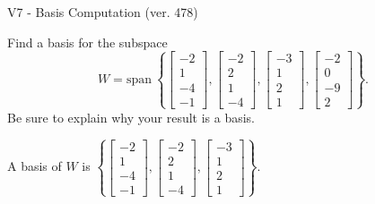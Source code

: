 \begin{exercise}
  \begin{exerciseTitle}V7 - Basis Computation (ver. 478)\end{exerciseTitle}
  \begin{exerciseStatement}
    Find a basis for the subspace 
\[W=\mathrm{span}\ \left\{\left[\begin{array}{r}
-2 \\
1 \\
-4 \\
-1
\end{array}\right] , \left[\begin{array}{r}
-2 \\
2 \\
1 \\
-4
\end{array}\right] , \left[\begin{array}{r}
-3 \\
1 \\
2 \\
1
\end{array}\right] , \left[\begin{array}{r}
-2 \\
0 \\
-9 \\
2
\end{array}\right]\right\}.\]
 Be sure to explain why your result is a basis.


  \end{exerciseStatement}
  \begin{exerciseAnswer}
   A basis of \(W\) is  \(\left\{\left[\begin{array}{r}
-2 \\
1 \\
-4 \\
-1
\end{array}\right] , \left[\begin{array}{r}
-2 \\
2 \\
1 \\
-4
\end{array}\right] , \left[\begin{array}{r}
-3 \\
1 \\
2 \\
1
\end{array}\right]\right\}\).
  


  \end{exerciseAnswer}
\end{exercise}